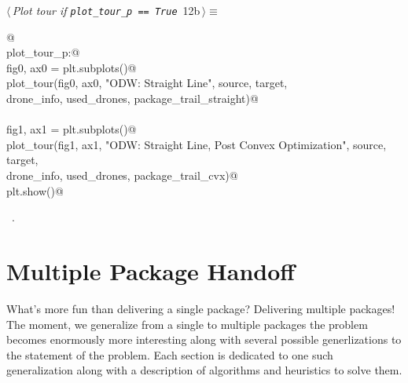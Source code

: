 \documentclass[10pt, english, oneside]{report}
\begin{document}
\begin{flushleft} \small
\begin{minipage}{\linewidth}\label{scrap12}\raggedright\small
{} $\langle\,${\itshape Plot tour if \verb|plot_tour_p == True|}\nobreak\ {\footnotesize {12b}}$\,\rangle\equiv$
\vspace{-1ex}
\begin{list}{}{} \item
\mbox{}\verb@   @\\
\mbox{}\verb@if plot_tour_p:@\\
\mbox{}\verb@     fig0, ax0 = plt.subplots()@\\
\mbox{}\verb@     plot_tour(fig0, ax0, "ODW: Straight Line", source, target, \@\\
\mbox{}\verb@               drone_info, used_drones, package_trail_straight)@\\
\mbox{}\verb@@\\
\mbox{}\verb@     fig1, ax1 = plt.subplots()@\\
\mbox{}\verb@     plot_tour(fig1, ax1, "ODW: Straight Line, Post Convex Optimization", source, target, \@\\
\mbox{}\verb@               drone_info, used_drones, package_trail_cvx)@\\
\mbox{}\verb@     plt.show()@\\
\mbox{}\verb@@{\NWsep}
\end{list}
\vspace{-1.5ex}
\footnotesize
\begin{list}{}{\setlength{\itemsep}{-\parsep}\setlength{\itemindent}{-\leftmargin}}
\item \NWtxtMacroRefIn\ .

\item{}
\end{list}
\end{minipage}\vspace{4ex}
\end{flushleft}


\chapter{Multiple Package Handoff}


What's more fun than delivering a single package? Delivering multiple packages! The moment, we generalize 
from a single to multiple packages the problem becomes enormously more interesting along with several 
possible generlizations to the statement of the problem. Each section is dedicated to one such generalization
along with a description of algorithms and heuristics to solve them. 
\end{document}
